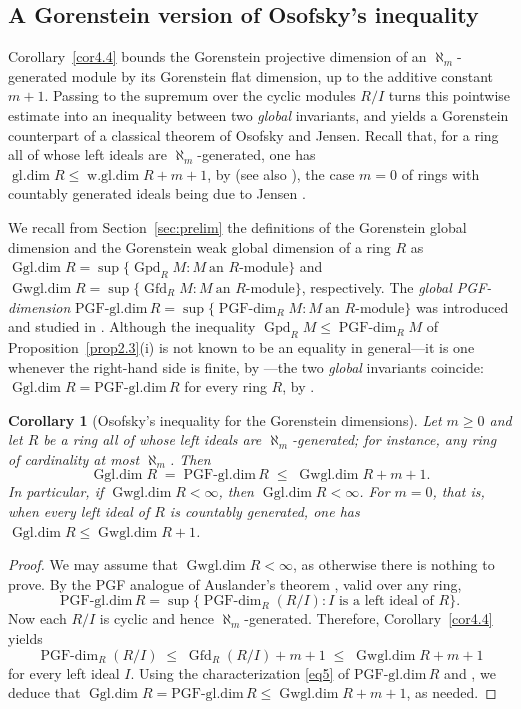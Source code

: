 \documentclass[12pt]{amsart}
\newtheorem{corollary}[theorem]{Corollary}
\theoremstyle{remark}
\theoremstyle{definition}
\theoremstyle{plain}
\DeclareMathOperator{\Gfd}{Gfd}
\DeclareMathOperator{\Gpd}{Gpd}
\DeclareMathOperator{\Gwgl}{Gwgl.dim}
\DeclareMathOperator{\Ggl}{Ggl.dim}
\DeclareMathOperator{\wgl}{w.gl.dim}
\DeclareMathOperator{\gldim}{gl.dim}
\newcommand{\PGFdim}{\operatorname{PGF\text{-}dim}}
\newcommand{\alephm}{\aleph_m}
\begin{document}
\subsection{A Gorenstein version of Osofsky's inequality}

Corollary~\ref{cor4.4} bounds the Gorenstein projective dimension of an $\alephm$-generated module by its Gorenstein flat dimension, up to the additive constant $m+1$. Passing to the supremum over the cyclic modules $R/I$ turns this pointwise estimate into an inequality between two \emph{global} invariants, and yields a Gorenstein counterpart of a classical theorem of Osofsky and Jensen. Recall that, for a ring all of whose left ideals are $\alephm$-generated, one has $\gldim R\le\wgl R+m+1$, by \cite[Corollary~2.47]{Oso} (see also \cite[Corollary~1.4]{Osofsky1968}), the case $m=0$ of rings with countably generated ideals being due to Jensen \cite{Jen2}.

We recall from Section~\ref{sec:prelim} the definitions of the Gorenstein global dimension and the Gorenstein weak global dimension of a ring $R$ as
$\Ggl R=\sup\{\Gpd_RM:M\ \text{an } R\text{-module}\}$ and $\Gwgl R=\sup\{\Gfd_RM:M\ \text{an } R\text{-module}\}$, respectively. The \emph{global PGF-dimension} $\mathrm{PGF\text{-}gl.dim}\,R=\sup\{\PGFdim_R M:M\ \text{an } R\text{-module}\}$ was introduced and studied in \cite{DE,ElM}. Although the inequality $\Gpd_RM\le\PGFdim_RM$ of Proposition~\ref{prop2.3}(i) is not known to be an equality in general---it is one whenever the right-hand side is finite, by \cite[Corollary~13(ii)]{DE}---the two \emph{global} invariants coincide: $\Ggl R=\mathrm{PGF\text{-}gl.dim}\,R$ for every ring $R$, by \cite[Theorem~4.16]{ElM}.

\begin{corollary}[Osofsky's inequality for the Gorenstein dimensions]\label{cor4.5}
Let $m\ge0$ and let $R$ be a ring all of whose left ideals are $\alephm$-generated; for instance, any ring of cardinality at most $\alephm$. Then
\[
\Ggl R\;=\;\mathrm{PGF\text{-}gl.dim}\,R\;\le\;\Gwgl R+m+1 .
\]
In particular, if $\Gwgl R<\infty$, then $\Ggl R<\infty$. For $m=0$, that is, when every left ideal of $R$ is countably generated, one has $\Ggl R\le\Gwgl R+1$.
\end{corollary}

\begin{proof}
We may assume that $\Gwgl R<\infty$, as otherwise there is nothing to prove. By the PGF analogue of Auslander's theorem \cite[Corollary~4.19]{ElM}, valid over any ring,
\begin{equation}\label{eq5}
	\mathrm{PGF\text{-}gl.dim}\,R=\sup\{\PGFdim_R(R/I):I\text{ is a left ideal of } R\}.
\end{equation}
Now each $R/I$ is cyclic and hence $\alephm$-generated. Therefore, Corollary~\ref{cor4.4} yields
\[
\PGFdim_R(R/I)\;\le\;\Gfd_R(R/I)+m+1\;\le\;\Gwgl R+m+1
\]
for every left ideal $I$. Using the characterization \eqref{eq5} of $\mathrm{PGF\text{-}gl.dim}\,R$ and \cite[Theorem~4.16]{ElM}, we deduce that $\Ggl R=\mathrm{PGF\text{-}gl.dim}\,R\le\Gwgl R+m+1$, as needed.
\end{proof}
\end{document}
